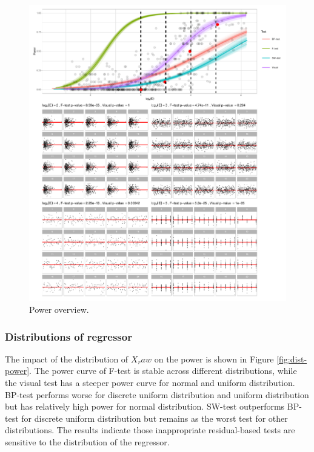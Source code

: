 \documentclass[]{interact}
\theoremstyle{plain}%
\theoremstyle{definition}
\theoremstyle{remark}
\begin{document}
\begin{figure}
\centering
\includegraphics{paper_comparison_files/figure-latex/power-overview-1.pdf}
\caption{Power overview. \label{fig:power-overview}}
\end{figure}

\hypertarget{distributions-of-regressor}{%
\subsubsection{Distributions of
regressor}\label{distributions-of-regressor}}

The impact of the distribution of \(X_raw\) on the power is shown in
Figure \ref{fig:dist-power}. The power curve of F-test is stable across
different distributions, while the visual test has a steeper power curve
for normal and uniform distribution. BP-test performs worse for discrete
uniform distribution and uniform distribution but has relatively high
power for normal distribution. SW-test outperforms BP-test for discrete
uniform distribution but remains as the worst test for other
distributions. The results indicate those inappropriate residual-based
tests are sensitive to the distribution of the regressor.
\end{document}

